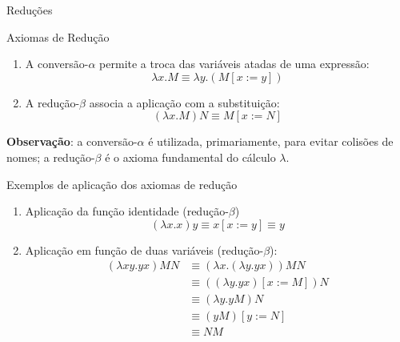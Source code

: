 \begin{frame}[fragile]{Reduções}

    \begin{block}{Axiomas de Redução}
        \begin{enumerate}
            \item A conversão-$\alpha$ permite a troca das variáveis atadas de uma expressão:
            \[
                \lambda x.M \equiv \lambda y.(M[x:=y])
            \]

            \item A redução-$\beta$ associa a aplicação com a substituição:
            \[
                (\lambda x.M)N \equiv M[x:=N]
            \]
        \end{enumerate}
    \end{block}

    \vspace{0.1in}

    \textbf{Observação}: a conversão-$\alpha$ é utilizada, primariamente, para evitar colisões
        de nomes; a redução-$\beta$ é o axioma fundamental do cálculo $\lambda$.
\end{frame}

\begin{frame}[fragile]{Exemplos de aplicação dos axiomas de redução}

    \begin{enumerate}
        \item Aplicação da função identidade (redução-$\beta$)
        \[
            (\lambda x.x)y \equiv x[x:=y] \equiv y
        \]

        \item Aplicação em função de duas variáveis (redução-$\beta$):
        \begin{align*}
            (\lambda xy.yx)MN & \equiv (\lambda x.(\lambda y.yx))MN \\
            & \equiv ((\lambda y.yx)[x:=M])N \\
            & \equiv (\lambda y.yM)N \\
            & \equiv (yM)[y:=N] \\
            & \equiv NM
        \end{align*}
    \end{enumerate}

\end{frame}

